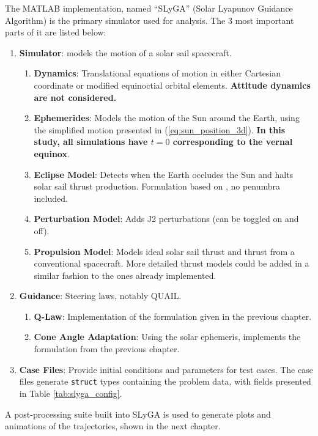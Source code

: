 The MATLAB implementation, named ``SLyGA'' (Solar Lyapunov Guidance Algorithm) is the primary simulator used for analysis. The 3 most important parts of it are listed below:
\begin{enumerate}
  \item \textbf{Simulator}: models the motion of a solar sail spacecraft.
        \begin{enumerate}
          \item \textbf{Dynamics}: Translational equations of motion in either Cartesian coordinate or modified equinoctial orbital elements. \textbf{Attitude dynamics are not considered.}
          \item \textbf{Ephemerides}: Models the motion of the Sun around the Earth, using the simplified motion presented in (\ref{eq:sun_position_3d}). \textbf{In this study, all simulations have \(t=0\) corresponding to the vernal equinox}.
          \item \textbf{Eclipse Model}: Detects when the Earth occludes the Sun and halts solar sail thrust production. Formulation based on \cite{curtis2014orbital}, no penumbra included.
          \item \textbf{Perturbation Model}: Adds J2 perturbations (can be toggled on and off).
          \item \textbf{Propulsion Model}: Models ideal solar sail thrust and thrust from a conventional spacecraft. More detailed thrust models could be added in a similar fashion to the ones already implemented.
        \end{enumerate}
  \item \textbf{Guidance}: Steering laws, notably QUAIL.
        \begin{enumerate}
          \item \textbf{Q-Law}: Implementation of the formulation given in the previous chapter.
          \item \textbf{Cone Angle Adaptation}: Using the solar ephemeris, implements the formulation from the previous chapter.
        \end{enumerate}
  \item \textbf{Case Files}: Provide initial conditions and parameters for test cases. The case files generate \verb|struct| types containing the problem data, with fields presented in Table \ref{tab:slyga_config}.
\end{enumerate}

A post-processing suite built into SLyGA is used to generate plots and animations of the trajectories, shown in the next chapter.

